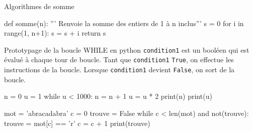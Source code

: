 	\begin{easybox}{Algorithmes de somme}
			\begin{CodePythontexAlt}[Largeur=1\linewidth,Centre,PremLigne=1, Lignes=false,]{}
			def somme(n):
				''' Renvoie la somme des entiers de 1 à n inclus'''
				s = 0
				for i in range(1, n+1):
					s = s + i
				return s

			\end{CodePythontexAlt}
			\end{easybox}

			\renewcommand{\arraystretch}{1}




		\begin{easybox}{Prototypage de la boucle WHILE en python}
	\verb|condition1| est un booléen qui est évalué à chaque tour de boucle.  Tant que \verb|condition1| \verb|True|, on effectue les instructions de la boucle. Lorsque \verb|condition1| devient \verb|False|, on sort de la boucle.

	
	\begin{minipage}{0.48\linewidth}
			\begin{CodePythontexAlt}[Largeur=1\linewidth,Centre,PremLigne=1]{}
			n = 0
			u = 1
			while u < 1000:
				n = n + 1
				u = u * 2
			print(n)
			print(u)
		\end{CodePythontexAlt}
				
		\end{minipage}\hfill
		\begin{minipage}{0.48\linewidth}
			\begin{CodePythontexAlt}[Largeur=1\linewidth,Centre,PremLigne=1]{}
			mot = 'abracadabra'
			c = 0
			trouve = False
			while c < len(mot) and not(trouve):
				trouve = mot[c] == 'r'
				c = c + 1
			print(trouve)
			\end{CodePythontexAlt}
		\end{minipage}	

			\end{easybox}

